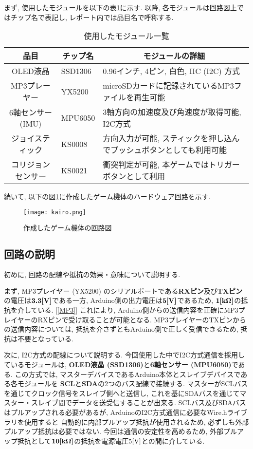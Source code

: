 \documentclass[10pt]{jsarticle}
\newcommand{\bm}[1]{{\mbox{\boldmath $#1$}}}
\begin{document}
まず, 使用したモジュールを以下の表\ref{moju}に示す.
以降, 各モジュールは回路図上ではチップ名で表記し, レポート内では品目名で呼称する.

\begin{table}[h]
 \caption{使用したモジュール一覧}
 \label{moju}
 \centering
  \begin{tabular}{c l l}
  \multicolumn{1}{c}{品目}	&	\multicolumn{1}{c}{チップ名}	&	\multicolumn{1}{c}{モジュールの詳細}\\
   \hline \hline
   OLED液晶	&	SSD1306	&	0.96インチ, 4ピン, 白色, IIC (I2C) 方式\\
   \hline
   MP3プレーヤー	&	YX5200	&	microSDカードに記録されているMP3ファイルを再生可能\\
   \hline
   6軸センサー (IMU)	&	MPU6050	&	3軸方向の加速度及び角速度が取得可能, I2C方式\\
   \hline
   ジョイスティック	&	KS0008	&	方向入力が可能, スティックを押し込んでプッシュボタンとしても利用可能\\
   \hline
   コリジョンセンサー	&	KS0021	&	衝突判定が可能, 本ゲームではトリガーボタンとして利用\\
   \hline
  \end{tabular}
\end{table}

続いて, 以下の図\ref{kairo}に作成したゲーム機体のハードウェア回路を示す.

\begin{figure}[h]
	\centering
	\texttt{[image: kairo.png]}
	\caption{作成したゲーム機体の回路図}
 	\label{kairo}
\end{figure}

\subsection{回路の説明}

初めに, 回路の配線や抵抗の効果・意味について説明する.

まず, MP3プレイヤー (YX5200) のシリアルポートである\textbf{RXピン}及び\textbf{TXピン}の電圧は$\bm{3.3\rm{[V]}}$である一方, 
Arduino側の出力電圧は$\bm{5\rm{[V]}}$であるため, $\bm{1\rm{[k\Omega]}}$の抵抗を介している. [\ref{MP3}]
これにより, Arduino側からの送信内容を正確にMP3プレイヤーのRXピンで受け取ることが可能となる.
MP3プレイヤーのTXピンからの送信内容については, 抵抗を介さずともArduino側で正しく受信できるため, 抵抗は不要となっている.

次に, I2C方式の配線について説明する.
今回使用した中でI2C方式通信を採用しているモジュールは, \textbf{OLED液晶 (SSD1306)}と\textbf{6軸センサー (MPU6050)}である.
この方式では, マスターデバイスであるArduino本体とスレイブデバイスである各モジュールを
\textbf{SCL}と\textbf{SDA}の2つのバス配線で接続する.
マスターがSCLバスを通じてクロック信号をスレイブ側へと送信し, 
これを基にSDAバスを通じてマスター・スレイブ間でデータを送受信することが出来る.
SCLバス及びSDAバスはプルアップされる必要があるが, ArduinoのI2C方式通信に必要なWire.hライブラリを使用すると
自動的に内部プルアップ抵抗が使用されるため, 必ずしも外部プルアップ抵抗は必要ではない.
今回は通信の安定性を高めるため, 外部プルアップ抵抗として$\bm{10\rm{[k\Omega]}}$の抵抗を電源電圧$5\rm{[V]}$との間に介している.
\end{document}
